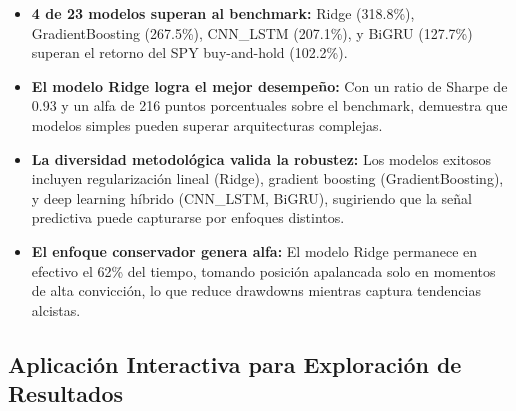 \documentclass[11pt,a4paper]{article}
\begin{document}
\begin{itemize}[noitemsep]
    \item \textbf{4 de 23 modelos superan al benchmark:} Ridge (318.8\%), GradientBoosting (267.5\%), CNN\_LSTM (207.1\%), y BiGRU (127.7\%) superan el retorno del SPY buy-and-hold (102.2\%).

    \item \textbf{El modelo Ridge logra el mejor desempeño:} Con un ratio de Sharpe de 0.93 y un alfa de 216 puntos porcentuales sobre el benchmark, demuestra que modelos simples pueden superar arquitecturas complejas.

    \item \textbf{La diversidad metodológica valida la robustez:} Los modelos exitosos incluyen regularización lineal (Ridge), gradient boosting (GradientBoosting), y deep learning híbrido (CNN\_LSTM, BiGRU), sugiriendo que la señal predictiva puede capturarse por enfoques distintos.

    \item \textbf{El enfoque conservador genera alfa:} El modelo Ridge permanece en efectivo el 62\% del tiempo, tomando posición apalancada solo en momentos de alta convicción, lo que reduce drawdowns mientras captura tendencias alcistas.
\end{itemize}

\subsection{Aplicación Interactiva para Exploración de Resultados}
\end{document}
